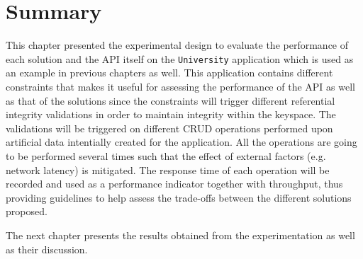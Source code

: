 \section{Summary} \label{sexp:Summary} 

This chapter  presented the experimental design to evaluate the performance of
each  solution and the  \ac{API} itself on the \texttt{University} application
which is  used as an example in previous chapters as well. This application
contains different constraints that makes it useful for assessing the
performance of the \ac{API} as well as that of the solutions since the
 constraints  will trigger different referential integrity validations in order
 to maintain integrity within the keyspace. The validations will be triggered on
 different \ac{CRUD} operations performed upon artificial data intentially
 created for the application. All the operations are going to be performed 
  several times such that the effect of external factors (e.g. network latency)
 is mitigated. The response time of each operation will be recorded and 
 used as a performance indicator together with throughput, thus providing 
 guidelines to help assess the trade-offs between the different solutions
proposed.
	
	
The next chapter presents the results obtained from the experimentation as well 
as their discussion.
 






